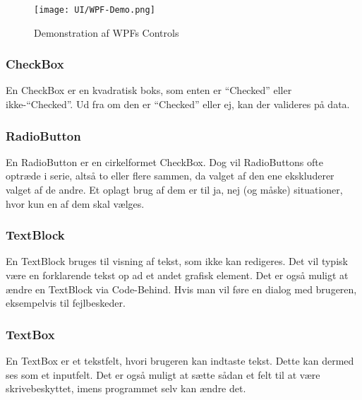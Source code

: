 \begin{wrapfigure}[22]{R}{0.5\textwidth}
    \label{img:wpfdemo}
    \vspace{-30pt}
    \begin{center}
        \texttt{[image: UI/WPF-Demo.png]}
    \end{center}
    \vspace{-15pt}
    \caption{Demonstration af WPFs Controls}
    \vspace{-15pt}
\end{wrapfigure}

\subsubsection*{CheckBox}
En CheckBox er en kvadratisk boks, som enten er ``Checked'' eller ikke-``Checked''. 
Ud fra om den er ``Checked'' eller ej, kan der valideres på data. 

\subsubsection*{RadioButton}
En RadioButton er en cirkelformet CheckBox.
Dog vil RadioButtons ofte optræde i serie, altså to eller flere sammen, da valget af den ene ekskluderer valget af de andre. 
Et oplagt brug af dem er til ja, nej (og måske) situationer, hvor kun en af dem skal vælges.

\subsubsection*{TextBlock}
En TextBlock bruges til visning af tekst, som ikke kan redigeres.
Det vil typisk være en forklarende tekst op ad et andet grafisk element.
Det er også muligt at ændre en TextBlock via Code-Behind. 
Hvis man vil føre en dialog med brugeren, eksempelvis til fejlbeskeder.

\subsubsection*{TextBox}
En TextBox er et tekstfelt, hvori brugeren kan indtaste tekst. 
Dette kan dermed ses som et inputfelt. 
Det er også muligt at sætte sådan et felt til at være skrivebeskyttet, imens programmet selv kan ændre det.


